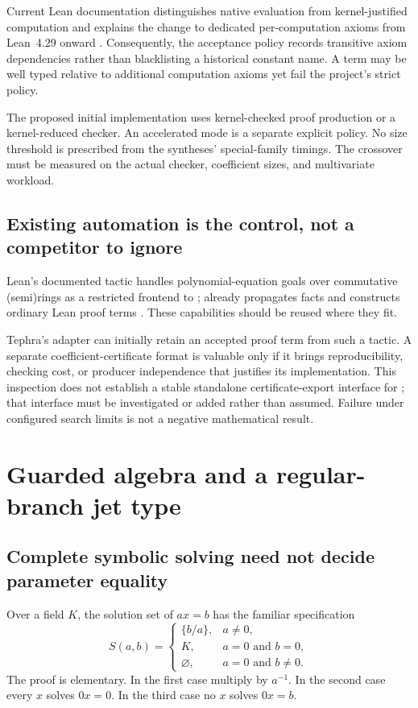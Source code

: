 \documentclass[11pt,a4paper]{article}
\newcommand{\code}[1]{\texttt{\detokenize{#1}}}
\theoremstyle{plain}
\theoremstyle{definition}
\begin{document}
Current Lean documentation distinguishes native evaluation from kernel-justified computation and explains the change to dedicated per-computation axioms from Lean~4.29 onward \cite{lean-validation}. Consequently, the acceptance policy records transitive axiom dependencies rather than blacklisting a historical constant name. A term may be well typed relative to additional computation axioms yet fail the project's strict policy.

The proposed initial implementation uses kernel-checked proof production or a kernel-reduced checker. An accelerated mode is a separate explicit policy. No size threshold is prescribed from the syntheses' special-family timings. The crossover must be measured on the actual checker, coefficient sizes, and multivariate workload.

\subsection{Existing automation is the control, not a competitor to ignore}
Lean's documented \code{grobner} tactic handles polynomial-equation goals over commutative (semi)rings as a restricted frontend to \code{grind}; \code{grind} already propagates facts and constructs ordinary Lean proof terms \cite{lean-tactics,lean-grind,lean-ring}. These capabilities should be reused where they fit.

Tephra's adapter can initially retain an accepted proof term from such a tactic. A separate coefficient-certificate format is valuable only if it brings reproducibility, checking cost, or producer independence that justifies its implementation. This inspection does not establish a stable standalone certificate-export interface for \code{grobner}; that interface must be investigated or added rather than assumed. Failure under configured search limits is not a negative mathematical result.

\section{Guarded algebra and a regular-branch jet type}\label{sec:jets}

\subsection{Complete symbolic solving need not decide parameter equality}
Over a field $K$, the solution set of $ax=b$ has the familiar specification
\[
 S(a,b)=
 \begin{cases}
  \{b/a\},&a\ne0,\\
  K,&a=0\text{ and }b=0,\\
  \varnothing,&a=0\text{ and }b\ne0.
 \end{cases}
\]
The proof is elementary. In the first case multiply by $a^{-1}$. In the second case every $x$ solves $0x=0$. In the third case no $x$ solves $0x=b$.
\end{document}
